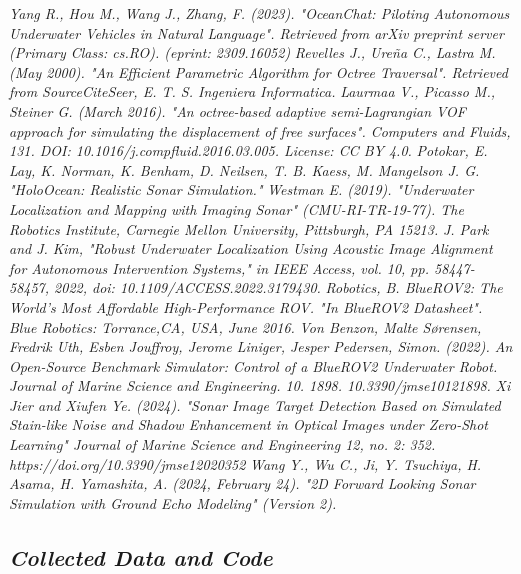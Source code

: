 \documentclass[]{article}
\begin{document}
\begin{thebibliography}{2}
	\bibitem[37]{} \textit {Yang R., Hou M., Wang J., Zhang, F. (2023). "OceanChat: Piloting Autonomous Underwater Vehicles in Natural Language". Retrieved from arXiv preprint server (Primary Class: cs.RO). (eprint: 2309.16052)}
	\bibitem[38]{} \textit{Revelles J., Ureña C., Lastra M. (May 2000). "An Efficient Parametric Algorithm for Octree Traversal". Retrieved from SourceCiteSeer, E. T. S. Ingeniera Informatica.}
	\bibitem[39]{} \textit{Laurmaa V., Picasso M., Steiner G. (March 2016). "An octree-based adaptive semi-Lagrangian VOF approach for simulating the displacement of free surfaces". Computers and Fluids, 131. DOI: 10.1016/j.compfluid.2016.03.005. License: CC BY 4.0.}
	\bibitem[40]{} \textit{Potokar, E. Lay, K. Norman, K. Benham, D. Neilsen, T. B. Kaess, M. Mangelson J. G. "HoloOcean: Realistic Sonar Simulation."}
	\bibitem[41]{} \textit{Westman E. (2019). "Underwater Localization and Mapping with Imaging Sonar" (CMU-RI-TR-19-77). The Robotics Institute, Carnegie Mellon University, Pittsburgh, PA 15213.}
	\bibitem[42]{} \textit{J. Park and J. Kim, "Robust Underwater Localization Using Acoustic Image Alignment for Autonomous Intervention Systems," in IEEE Access, vol. 10, pp. 58447-58457, 2022, doi: 10.1109/ACCESS.2022.3179430.}
	\bibitem[43]{} \textit{Robotics, B. BlueROV2: The World’s Most Affordable High-Performance ROV. "In BlueROV2 Datasheet". Blue Robotics: Torrance,CA, USA, June 2016.}
	\bibitem[44]{} \textit{Von Benzon, Malte Sørensen, Fredrik Uth, Esben Jouffroy, Jerome Liniger, Jesper Pedersen, Simon. (2022). An Open-Source Benchmark Simulator: Control of a BlueROV2 Underwater Robot. Journal of Marine Science and Engineering. 10. 1898. 10.3390/jmse10121898. }
	\bibitem[45]{} \textit{Xi Jier and Xiufen Ye. (2024). "Sonar Image Target Detection Based on Simulated Stain-like Noise and Shadow Enhancement in Optical Images under Zero-Shot Learning" Journal of Marine Science and Engineering 12, no. 2: 352. https://doi.org/10.3390/jmse12020352}
	\bibitem[46]{} \textit{Wang Y., Wu C., Ji, Y. Tsuchiya, H. Asama, H. Yamashita, A. (2024, February 24). "2D Forward Looking Sonar Simulation with Ground Echo Modeling" (Version 2).}
	
	 
		
	
	\end{thebibliography}
	
	
	\newpage
	
	\clearpage
	\appendix
	\begin{center}
	\section{\textit{Collected Data and Code}}
	\end{center}
	
\end{document}
